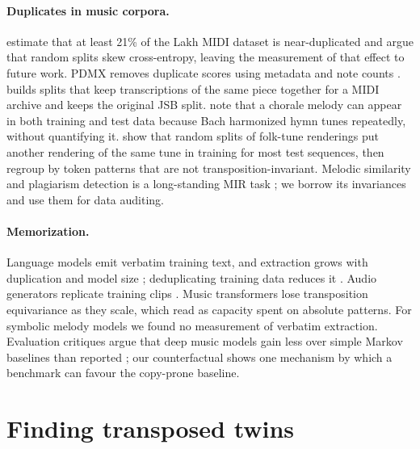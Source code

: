 \documentclass[ProofPDF]{./Styles/Jnls-Template-V3}
\begin{document}
\paragraph{Duplicates in music corpora.} \cite{choi2025lmddedup} estimate that at least 21\% of the Lakh MIDI dataset is near-duplicated and argue that random splits skew cross-entropy, leaving the measurement of that effect to future work. PDMX removes duplicate scores using metadata and note counts \citep{long2025pdmx}. \cite{walder2016beyond} builds splits that keep transcriptions of the same piece together for a MIDI archive and keeps the original JSB split. \cite{leemhuis2019bacher} note that a chorale melody can appear in both training and test data because Bach harmonized hymn tunes repeatedly, without quantifying it. \cite{fathi2026howfarback} show that random splits of folk-tune renderings put another rendering of the same tune in training for most test sequences, then regroup by token patterns that are not transposition-invariant. Melodic similarity and plagiarism detection is a long-standing MIR task \citep{yin2021goodalgorithm,yin2022originality,lu2025melodysim}; we borrow its invariances and use them for data auditing.

\paragraph{Memorization.} Language models emit verbatim training text, and extraction grows with duplication and model size \citep{carlini2021extracting,carlini2023quantifying}; deduplicating training data reduces it \citep{kandpal2022dedupprivacy,lee2022dedup}. Audio generators replicate training clips \citep{bralios2024replication,batlleroca2024replication}. Music transformers lose transposition equivariance as they scale, which \cite{guo2026emt} read as capacity spent on absolute patterns. For symbolic melody models we found no measurement of verbatim extraction. Evaluation critiques argue that deep music models gain less over simple Markov baselines than reported \citep{yin2023shallowgains}; our counterfactual shows one mechanism by which a benchmark can favour the copy-prone baseline.

\section{Finding transposed twins}\label{sec:method}
\end{document}
